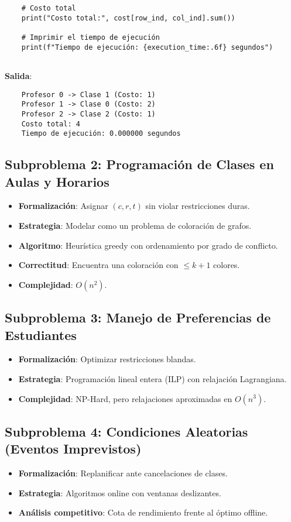 \documentclass[12pt, a4paper]{article}
\begin{document}
\begin{itemize}
\begin{verbatim}
    # Costo total
    print("Costo total:", cost[row_ind, col_ind].sum())
    
    # Imprimir el tiempo de ejecución
    print(f"Tiempo de ejecución: {execution_time:.6f} segundos")
    
    \end{verbatim}
    
    \textbf{Salida}:
    \begin{verbatim}
    Profesor 0 -> Clase 1 (Costo: 1)
    Profesor 1 -> Clase 0 (Costo: 2)
    Profesor 2 -> Clase 2 (Costo: 1)
    Costo total: 4
    Tiempo de ejecución: 0.000000 segundos
    \end{verbatim}
    
\end{itemize}

\subsection{Subproblema 2: Programación de Clases en Aulas y Horarios}
\begin{itemize}
    \item \textbf{Formalización}: Asignar \( (c, r, t) \) sin violar restricciones duras.
    \item \textbf{Estrategia}: Modelar como un problema de coloración de grafos.
    \item \textbf{Algoritmo}: Heurística greedy con ordenamiento por grado de conflicto.
    \item \textbf{Correctitud}: Encuentra una coloración con \( \leq k+1 \) colores.
    \item \textbf{Complejidad}: \( O(n^2) \).
\end{itemize}

\subsection{Subproblema 3: Manejo de Preferencias de Estudiantes}
\begin{itemize}
    \item \textbf{Formalización}: Optimizar restricciones blandas.
    \item \textbf{Estrategia}: Programación lineal entera (ILP) con relajación Lagrangiana.
    \item \textbf{Complejidad}: NP-Hard, pero relajaciones aproximadas en \( O(n^3) \).
\end{itemize}

\subsection{Subproblema 4: Condiciones Aleatorias (Eventos Imprevistos)}
\begin{itemize}
    \item \textbf{Formalización}: Replanificar ante cancelaciones de clases.
    \item \textbf{Estrategia}: Algoritmos online con ventanas deslizantes.
    \item \textbf{Análisis competitivo}: Cota de rendimiento frente al óptimo offline.
\end{itemize}
\end{document}
